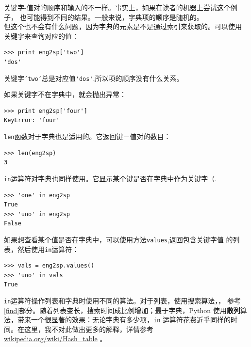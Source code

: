 关键字-值对的顺序和输入的不一样。事实上，如果在读者的机器上尝试这个例子，
也可能得到不同的结果。一般来说，字典项的顺序是随机的。\\

但这个也不会有什么问题，因为字典的元素是不是通过索引来获取的。可以使用
关键字来查询对应的值：

\beforeverb
\begin{verbatim}
>>> print eng2sp['two']
'dos'
\end{verbatim}
\afterverb

关键字{\tt 'two'}总是对应值\verb"'dos'",所以项的顺序没有什么关系。

如果关键字不在字典中，就会抛出异常：


\beforeverb
\begin{verbatim}
>>> print eng2sp['four']
KeyError: 'four'
\end{verbatim}
\afterverb

{\tt len}函数对于字典也是适用的。它返回键－值对的数目：


\beforeverb
\begin{verbatim}
>>> len(eng2sp)
3
\end{verbatim}
\afterverb

{\tt in}运算符对字典也同样使用。它显示某个键是否在字典中作为关键字（.



\beforeverb
\begin{verbatim}
>>> 'one' in eng2sp
True
>>> 'uno' in eng2sp
False
\end{verbatim}
\afterverb

如果想查看某个值是否在字典中，可以使用方法{\tt values},返回包含关键字值
的列表，然后使用{\tt in}运算符：


\beforeverb
\begin{verbatim}
>>> vals = eng2sp.values()
>>> 'uno' in vals
True
\end{verbatim}
\afterverb

{\tt in}运算符操作列表和字典时使用不同的算法。对于列表，使用搜索算法，，
参考\ref{find}部分。随着列表变长，搜索时间成比例增加；最于字典，Python
使用{\bf 散列}算法，带来一个很显著的效果：无论字典有多少项，{\tt in}
运算符花费近乎同样的时间。在这里，我不对此做出更多的解释，详情参考
\url{wikipedia.org/wiki/Hash_table} 。

